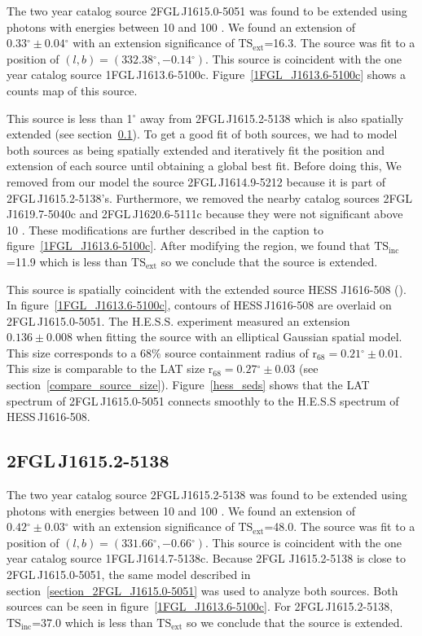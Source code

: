 \documentclass[12pt,preprint]{aastex}
\newcommand{\gev}{\text{GeV}\xspace}
\newcommand{\tev}{\text{TeV}\xspace}
\newcommand{\tsext}{{\ensuremath{\text{TS}_\text{ext}}}\xspace}
\newcommand{\tsinc}{\ensuremath{\text{TS}_\text{inc}}\xspace}
\newcommand{\rsixeight}{{\ensuremath{\text{r}_{68}}}\xspace}
\renewcommand{\deg}{\ensuremath{^\circ}\xspace}
\begin{document}
The two year catalog source 2FGL\,J1615.0-5051 was found to be
extended using photons with energies between 10 \gev and 100 \gev.
We found an extension of $0.33\deg\pm0.04\deg$ with an extension
significance of \tsext=16.3.  The source was fit to a position of
$(l,b)=(332.38\deg,-0.14\deg)$.  This source is coincident with the one
year catalog source 1FGL\,J1613.6-5100c.  Figure~\ref{1FGL_J1613.6-5100c}
shows a counts map of this source.

This source is less than 1\deg away from 2FGL\,J1615.2-5138 which is
also spatially extended (see section~\ref{section_2FGL_J1615.2-5138}).
To get a good fit of both sources, we had to model both sources as
being spatially extended and iteratively fit the position and extension
of each source until obtaining a global best fit.  Before doing this,
We removed from our model the source 2FGL\,J1614.9-5212 because it is
part of 2FGL\,J1615.2-5138's. Furthermore, we removed
the nearby catalog sources 2FGL\,J1619.7-5040c and 2FGL\,J1620.6-5111c
because they were not significant above 10 \gev.  These modifications
are further described in the caption to figure~\ref{1FGL_J1613.6-5100c}.
After modifying the region, we found that \tsinc=11.9 which is less than
\tsext so we conclude that the source is extended.

This source is spatially coincident with the extended \tev source HESS
J1616-508 (\cite{hess_plane_survey}).  In figure~\ref{1FGL_J1613.6-5100c},
contours of HESS\,J1616-508 are overlaid on 2FGL\,J1615.0-5051.
The H.E.S.S. experiment measured an extension $0.136\pm 0.008$
when fitting the source with an elliptical Gaussian spatial model.
This size corresponds to a 68\% source containment radius of
$\rsixeight=0.21\deg\pm0.01$. This size is comparable to the LAT size
$\rsixeight=0.27\deg\pm0.03$ (see section~\ref{compare_source_size}).
Figure~\ref{hess_seds} shows that the LAT spectrum of 2FGL\,J1615.0-5051
connects smoothly to the H.E.S.S spectrum of HESS\,J1616-508.


\subsection{2FGL\,J1615.2-5138}
\label{section_2FGL_J1615.2-5138}

The two year catalog source 2FGL\,J1615.2-5138 was found to be
extended using photons with energies between 10 \gev and 100 \gev.
We found an extension of $0.42\deg\pm0.03\deg$ with an extension
significance of \tsext=48.0.  The source was fit to a position
of $(l,b)=(331.66\deg,-0.66\deg)$.  This source is coincident
with the one year catalog source 1FGL\,J1614.7-5138c.  Because 2FGL
J1615.2-5138 is close to 2FGL\,J1615.0-5051, the same model described
in section~\ref{section_2FGL_J1615.0-5051} was used to analyze both
sources. Both sources can be seen in figure~\ref{1FGL_J1613.6-5100c}.
For 2FGL\,J1615.2-5138, \tsinc=37.0 which is less than \tsext so we
conclude that the source is extended.
\end{document}
